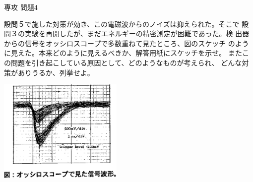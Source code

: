 \documentclass[fleqn]{jbook}
\begin{document}
\begin{question}{専攻 問題4}{}
\begin{subquestions}
\SubQuestion
  \parbox[t]{90mm}{
 設問５で施した対策が効き、この電磁波からのノイズは抑えられた。そこで
 設問３の実験を再開したが、まだエネルギーの精密測定が困難であった。検
 出器からの信号をオッシロスコープで多数重ねて見たところ、図のスケッチ
 のように見えた。本来どのように見えるべきか、解答用紙にスケッチを示せ。
 またこの問題を引き起こしている原因として、どのようなものが考えられ、
 どんな対策がありうるか、列挙せよ。
}
\parbox[t]{60mm}{
\begin{center}
  \includegraphics[width=60mm]{1998physQ4_0r.eps} %
\end{center}
}
\end{subquestions}
\end{question}
\end{document}
